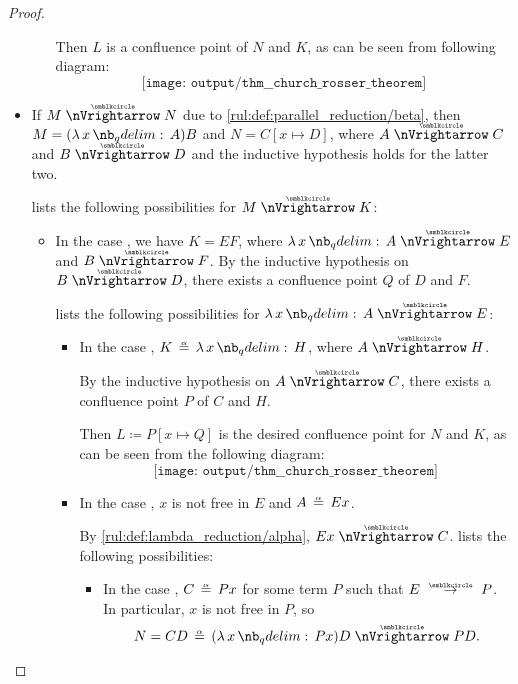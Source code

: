 \begin{proof}
\begin{itemize}
\begin{itemize}
      Then \( L \) is a confluence point of \( N \) and \( K \), as can be seen from following diagram:
      \begin{equation*}
        \texttt{[image: output/thm\_\_church\_rosser\_theorem]}
      \end{equation*}
    \end{itemize}

    \item If \( M \ppred N \) due to \ref{rul:def:parallel_reduction/beta}, then \( M = (\qabs x A)B \) and \( N = C[x \mapsto D] \), where \( A \ppred C \) and \( B \ppred D \) and the inductive hypothesis holds for the latter two.

     lists the following possibilities for \( M \ppred K \):
    \begin{itemize}
      \item In the case , we have \( K = EF \), where \( \qabs x A \ppred E \) and \( B \ppred F \). By the inductive hypothesis on \( B \ppred D \), there exists a confluence point \( Q \) of \( D \) and \( F \).

       lists the following possibilities for \( \qabs x A \ppred E \):
      \begin{itemize}
        \item In the case , \( K \aequiv \qabs x H \), where \( A \ppred H \).

        By the inductive hypothesis on \( A \ppred C \), there exists a confluence point \( P \) of \( C \) and \( H \).

        Then \( L \coloneqq P[x \mapsto Q] \) is the desired confluence point for \( N \) and \( K \), as can be seen from the following diagram:
        \begin{equation*}
          \texttt{[image: output/thm\_\_church\_rosser\_theorem]}
        \end{equation*}

        \item In the case , \( x \) is not free in \( E \) and \( A \aequiv Ex \).

        By \ref{rul:def:lambda_reduction/alpha}, \( Ex \ppred C \).  lists the following possibilities:
        \begin{itemize}
          \item In the case , \( C \aequiv Px \) for some term \( P \) such that \( E \pred P \). In particular, \( x \) is not free in \( P \), so
          \begin{equation*}
            N = CD \aequiv (\qabs x P x) D \ppred PD.
          \end{equation*}


\end{itemize}
\end{itemize}
\end{itemize}
\end{itemize}
\end{proof}
